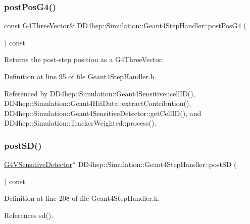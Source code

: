 \subsubsection{\texorpdfstring{post\+Pos\+G4()}{postPosG4()}}
{\footnotesize\ttfamily const G4\+Three\+Vector\& D\+D4hep\+::\+Simulation\+::\+Geant4\+Step\+Handler\+::post\+Pos\+G4 (\begin{DoxyParamCaption}{ }\end{DoxyParamCaption}) const\hspace{0.3cm}{\ttfamily [inline]}}



Returns the post-\/step position as a G4\+Three\+Vector. 



Definition at line 95 of file Geant4\+Step\+Handler.\+h.



Referenced by D\+D4hep\+::\+Simulation\+::\+Geant4\+Sensitive\+::cell\+I\+D(), D\+D4hep\+::\+Simulation\+::\+Geant4\+Hit\+Data\+::extract\+Contribution(), D\+D4hep\+::\+Simulation\+::\+Geant4\+Sensitive\+Detector\+::get\+Cell\+I\+D(), and D\+D4hep\+::\+Simulation\+::\+Tracker\+Weighted\+::process().

\hypertarget{class_d_d4hep_1_1_simulation_1_1_geant4_step_handler_adb9d9942e898b61710985c58eda88972}{}\label{class_d_d4hep_1_1_simulation_1_1_geant4_step_handler_adb9d9942e898b61710985c58eda88972} 
\subsubsection{\texorpdfstring{post\+S\+D()}{postSD()}}
{\footnotesize\ttfamily \hyperlink{class_g4_v_sensitive_detector}{G4\+V\+Sensitive\+Detector}$\ast$ D\+D4hep\+::\+Simulation\+::\+Geant4\+Step\+Handler\+::post\+SD (\begin{DoxyParamCaption}{ }\end{DoxyParamCaption}) const\hspace{0.3cm}{\ttfamily [inline]}}



Definition at line 208 of file Geant4\+Step\+Handler.\+h.



References sd().



